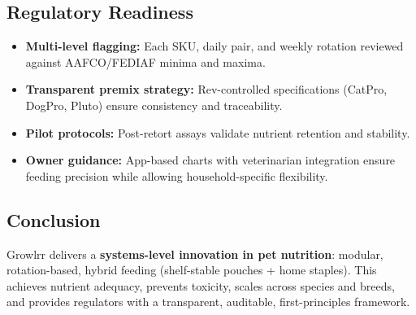 \subsection*{Regulatory Readiness}

\begin{itemize}[leftmargin=1.5em]
\item \textbf{Multi-level flagging:} Each SKU, daily pair, and weekly rotation reviewed against AAFCO/FEDIAF minima and maxima.
\item \textbf{Transparent premix strategy:} Rev-controlled specifications (CatPro, DogPro, Pluto) ensure consistency and traceability.
\item \textbf{Pilot protocols:} Post-retort assays validate nutrient retention and stability.
\item \textbf{Owner guidance:} App-based charts with veterinarian integration ensure feeding precision while allowing household-specific flexibility.
\end{itemize}

\subsection*{Conclusion}

Growlrr delivers a \textbf{systems-level innovation in pet nutrition}: modular, rotation-based, hybrid feeding (shelf-stable pouches + home staples). This achieves nutrient adequacy, prevents toxicity, scales across species and breeds, and provides regulators with a transparent, auditable, first-principles framework.